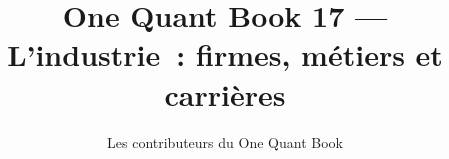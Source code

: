 \documentclass[11pt,a4paper,twoside,openany]{book}
\title{One Quant Book 17 --- L'industrie~: firmes, métiers et carrières}
\author{Les contributeurs du One Quant Book}
\date{\bookdate}
\begin{document}
\frontmatter



\tableofcontents

\mainmatter


\appendix
\part{\omsolutionspart}


\backmatter
\printindex
\end{document}
